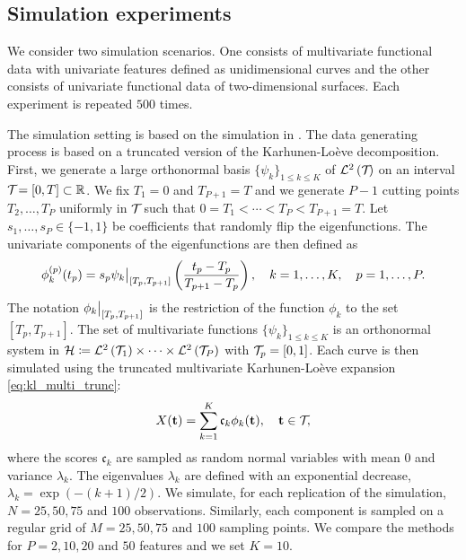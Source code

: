 \subsection{Simulation experiments} %
\label{sub:simulation_experiments}

We consider two simulation scenarios. One consists of multivariate functional data with univariate features defined as unidimensional curves and the other consists of univariate functional data of two-dimensional surfaces. Each experiment is repeated $500$ times.

\begin{scenario}
The simulation setting is based on the simulation in \cite{happMultivariateFunctionalPrincipal2018a}. The data generating process is based on a truncated version of the Karhunen-Loève decomposition. First, we generate a large orthonormal basis $\{\psi_k\}_{1 \leq k \leq K}$ of $\mathcal{L}^{2}\left(\mathcal{T}_{}\right)$ on an interval $\mathcal{T}_{} = [0, T] \subset \mathbb{R}$. We fix $T_1 = 0$ and $T_{P + 1} = T$ and we generate $P - 1$ cutting points $T_2, \dots, T_P$ uniformly in $\mathcal{T}_{}$ such that $0 = T_1 < \cdots < T_P < T_{P+1} = T$. Let $s_1, \dots, s_P \in \{-1, 1\}$ be coefficients that randomly flip the eigenfunctions. The univariate components of the eigenfunctions are then defined as
\begin{equation}\label{eq:simulation_uni_component}
    \phi_k^{(p)}(t_p) = s_p \restr{\psi_k}{[T_p, T_{p + 1}]}\left(\frac{t_p - T_p}{T_{p + 1} - T_p}\right), \quad k = 1, \dots, K, \quad p = 1, \dots, P.
\end{equation}
The notation $\restr{\phi_k}{[T_p, T_{p + 1}]}$ is the restriction of the function $\phi_k$ to the set $[T_p, T_{p + 1}]$. The set of multivariate functions $\{\psi_k\}_{1 \leq k \leq K}$ is an orthonormal system in $\mathcal{H} \coloneqq \mathcal{L}^{2}\left(\mathcal{T}_{1}\right) \times \dots \times \mathcal{L}^{2}\left(\mathcal{T}_{P}\right)$ with $\mathcal{T}_{p} = [0, 1]$. Each curve is then simulated using the truncated multivariate Karhunen-Loève expansion \eqref{eq:kl_multi_trunc}:
\begin{equation}
    X(\mathbf{t}) = \sum_{k = 1}^K \mathfrak{c}_k \phi_k(\mathbf{t}), \quad \mathbf{t} \in \mathcal{T}_{},
\end{equation}
where the scores $\mathfrak{c}_k$ are sampled as random normal variables with mean $0$ and variance $\lambda_k$. The eigenvalues $\lambda_k$ are defined with an exponential decrease, $\lambda_k = \exp(-(k + 1)/2)$. We simulate, for each replication of the simulation, $N = 25, 50, 75$ and $100$ observations. Similarly, each component is sampled on a regular grid of $M = 25, 50, 75$ and $100$ sampling points. We compare the methods for $P = 2, 10, 20$ and $50$ features and we set $K = 10$.
\end{scenario}

